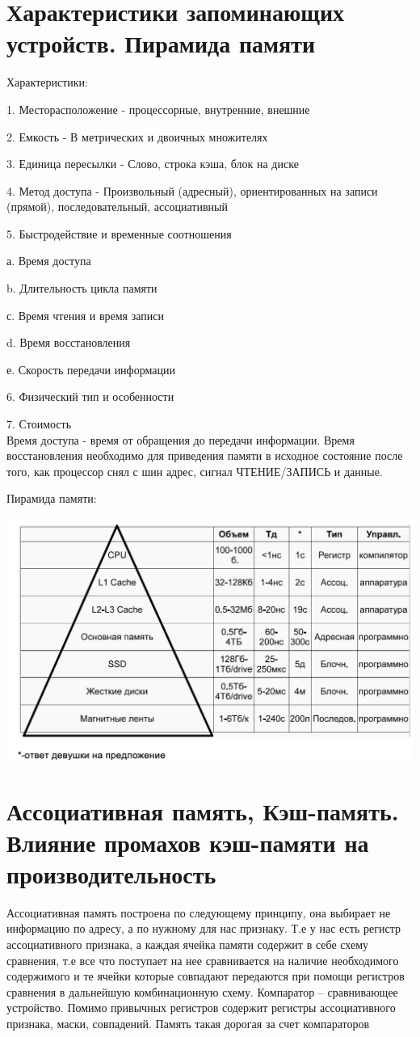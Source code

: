 \documentclass{article}
\begin{document}
\section{Характеристики запоминающих устройств. Пирамида памяти}
Характеристики:

1. Месторасположение - процессорные, внутренние, внешние

2. Емкость - В метрических и двоичных множителях

3. Единица пересылки - Слово, строка кэша, блок на диске

4. Метод доступа - Произвольный (адресный), ориентированных на записи (прямой), последовательный, ассоциативный

5. Быстродействие и временные соотношения

а. Время доступа 

b. Длительность цикла памяти 

с. Время чтения и время записи

d. Время восстановления 

е. Скорость передачи информации

6. Физический тип и особенности

7. Стоимость
\\ 

Время доступа - время от обращения до передачи информации.
Время восстановления необходимо для приведения памяти в исходное состояние после того, как процессор снял с шин адрес, сигнал ЧТЕНИЕ/ЗАПИСЬ и данные.


Пирамида памяти:

\includegraphics[width=.8\textwidth]{memory.png}

\section{Ассоциативная память, Кэш-память. Влияние промахов кэш-памяти на производительность}
Ассоциативная память построена по следующему принципу, она выбирает не информацию по адресу, а по нужному для нас признаку. 
Т.е у нас есть регистр ассоциативного признака, а каждая ячейка памяти содержит в себе схему сравнения, т.е все что поступает на нее сравнивается 
на наличие необходимого содержимого и те ячейки которые совпадают передаются при помощи регистров сравнения в дальнейшую комбинационную схему.
Компаратор – сравнивающее устройство. Помимо привычных регистров содержит регистры ассоциативного признака, маски, совпадений.
Память такая дорогая за счет компараторов
\end{document}

